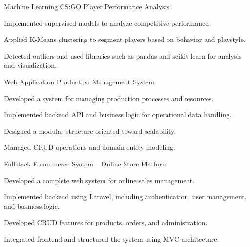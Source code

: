 \begin{cventries}
\cventry
  {Machine Learning}
  {CS:GO Player Performance Analysis}
  {}
  {}
  {
    \begin{cvitems}
      \item {Implemented supervised models to analyze competitive performance.}
      \item {Applied K-Means clustering to segment players based on behavior and playstyle.}
      \item {Detected outliers and used libraries such as pandas and scikit-learn for analysis and visualization.}
    \end{cvitems}
    \vspace{5mm}
  }

\cventry
  {Web Application}
  {Production Management System}
  {}
  {}
  {
    \begin{cvitems}
      \item {Developed a system for managing production processes and resources.}
      \item {Implemented backend API and business logic for operational data handling.}
      \item {Designed a modular structure oriented toward scalability.}
      \item {Managed CRUD operations and domain entity modeling.}
    \end{cvitems}
    \vspace{5mm}
  }
  
\cventry
  {Fullstack}
  {E-commerce System – Online Store Platform}
  {}
  {}
  {
    \begin{cvitems}
      \item {Developed a complete web system for online sales management.}
      \item {Implemented backend using Laravel, including authentication, user management, and business logic.}
      \item {Developed CRUD features for products, orders, and administration.}
      \item {Integrated frontend and structured the system using MVC architecture.}
    \end{cvitems}
    \vspace{5mm}
  }

\end{cventries}